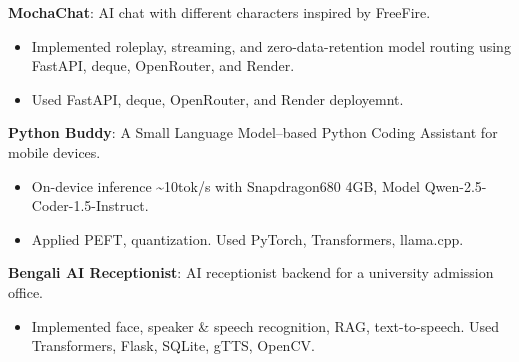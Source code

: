 
\begin{cvlistsection}

\item \textbf{MochaChat}: AI chat with different characters inspired by FreeFire.
\href{https://mocha-chat.onrender.com/}{\textcolor{Cerulean}{\faExternalLink*}}
\begin{itemize}[leftmargin=2.5em, nosep, noitemsep]
  \item[\textendash] Implemented roleplay, streaming, and zero-data-retention model routing using FastAPI, deque, OpenRouter, and Render.
  \item[\textendash] Used FastAPI, deque, OpenRouter, and Render deployemnt.
\end{itemize}

\item \textbf{Python Buddy}: A Small Language Model–based Python Coding Assistant for mobile devices.
\href{https://github.com/2ufiq/slm-python-buddy}{\faGithub}
\begin{itemize}[leftmargin=2.5em, nosep, noitemsep]
  \item[\textendash] On-device inference \~{}10tok/s with Snapdragon680 4GB, Model Qwen-2.5-Coder-1.5-Instruct. 
  \item[\textendash] Applied PEFT, quantization. Used PyTorch, Transformers, llama.cpp.
\end{itemize}

\item \textbf{Bengali AI Receptionist}: AI receptionist backend for a university admission office.
\href{https://github.com/2ufiq/Bengali-AI-Recieptionist}{\faGithub}
\begin{itemize}[leftmargin=2.5em, nosep, noitemsep]
  \item[\textendash] Implemented face, speaker \& speech recognition, RAG, text-to-speech. Used Transformers, Flask, SQLite, gTTS, OpenCV.
\end{itemize}
\end{cvlistsection}
